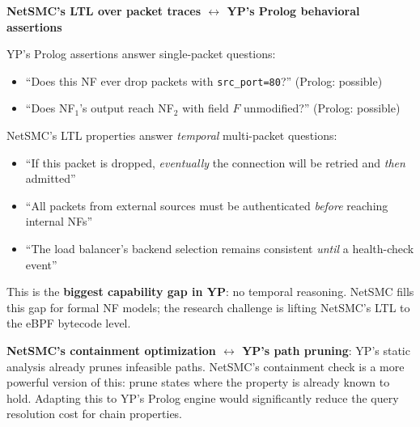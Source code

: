 \begin{analogybox}
\textbf{NetSMC's LTL over packet traces $\leftrightarrow$ YP's Prolog behavioral assertions}

YP's Prolog assertions answer single-packet questions:
\begin{itemize}
  \item ``Does this NF ever drop packets with \texttt{src\_port=80}?'' (Prolog: possible)
  \item ``Does NF$_1$'s output reach NF$_2$ with field $F$ unmodified?'' (Prolog: possible)
\end{itemize}

NetSMC's LTL properties answer \emph{temporal} multi-packet questions:
\begin{itemize}
  \item ``If this packet is dropped, \emph{eventually} the connection will be retried and \emph{then} admitted''
  \item ``All packets from external sources must be authenticated \emph{before} reaching internal NFs''
  \item ``The load balancer's backend selection remains consistent \emph{until} a health-check event''
\end{itemize}

This is the \textbf{biggest capability gap in YP}: no temporal reasoning. NetSMC fills this gap for formal NF models; the research challenge is lifting NetSMC's LTL to the eBPF bytecode level.

\textbf{NetSMC's containment optimization $\leftrightarrow$ YP's path pruning}:
YP's static analysis already prunes infeasible paths. NetSMC's containment check is a more powerful version of this: prune states where the property is already known to hold. Adapting this to YP's Prolog engine would significantly reduce the query resolution cost for chain properties.
\end{analogybox}

